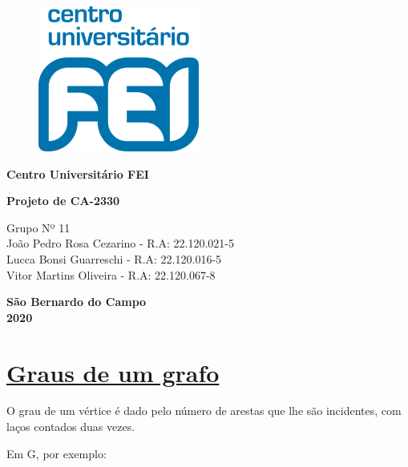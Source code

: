 \documentclass{article}
\begin{document}
\begin{titlepage}
	\begin{figure}[H]
		\centering
		\includegraphics[width=0.1\linewidth]{Figuras/logofei}
		\label{fig:logofei}
	\end{figure}
	
	\begin{center}
		{\large \textbf{Centro Universitário FEI} }
	\end{center}
	
	\vspace*{3cm}
	
	\begin{center}
		{\Large {\bf{ Projeto de CA-2330 \\ 
					\vspace*{0.5cm}{\large Relatório - Parte 2}}}}
	\end{center}\vspace*{5cm}
	
	\begin{center}
		Grupo Nº 11 \vspace*{0.2cm} \\ João Pedro Rosa Cezarino - R.A: 22.120.021-5  \\ Lucca Bonsi Guarreschi - R.A: 22.120.016-5  \\ Vitor Martins Oliveira - R.A: 22.120.067-8
	\end{center}
	
	\vspace*{7cm}
	\begin{center} \textbf{São Bernardo do Campo \\ 2020}\end{center}
	
\end{titlepage}
	\newpage
	\setcounter{page}{1} %
	
	\section{{\Large \underline{Graus de um grafo}}}
		O grau de um vértice é dado pelo número de arestas que lhe são incidentes, com laços contados duas vezes.\vspace*{0.2cm}
		
		Em G, por exemplo:
		
\end{document}
